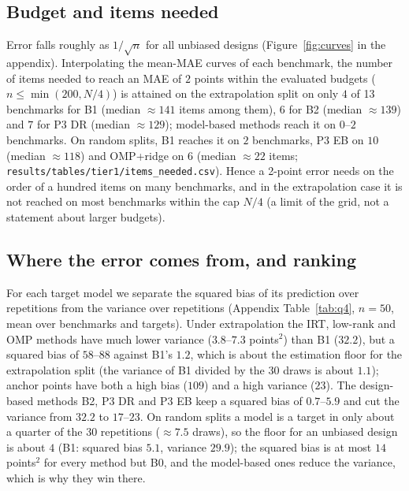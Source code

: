 \begin{table}[t]
\caption{Ablation of P3 on the 13 Tier-1 benchmarks: MAE difference to the random subset mean B1 (points; negative is better), with 95\% two-level (repetitions, then target models) bootstrap intervals, and contrasts between estimators (repetition-only intervals, same sign convention: first minus second). Generated by \texttt{paper/make\_tables.py} from \texttt{results/tables/review/}.}
\label{tab:ablation}
\centering
\resizebox{\linewidth}{!}{}
\end{table}

\subsection{Budget and items needed}
Error falls roughly as $1/\sqrt n$ for all unbiased designs (Figure~\ref{fig:curves} in the appendix). Interpolating the mean-MAE curves of each benchmark, the number of items needed to reach an MAE of $2$ points within the evaluated budgets ($n\le\min(200,N/4)$) is attained on the extrapolation split on only $4$ of 13 benchmarks for B1 (median $\approx 141$ items among them), $6$ for B2 (median $\approx 139$) and $7$ for P3 DR (median $\approx 129$); model-based methods reach it on $0$--$2$ benchmarks. On random splits, B1 reaches it on $2$ benchmarks, P3 EB on $10$ (median $\approx118$) and OMP+ridge on $6$ (median $\approx 22$ items; \texttt{results/tables/tier1/items\_needed.csv}). Hence a 2-point error needs on the order of a hundred items on many benchmarks, and in the extrapolation case it is not reached on most benchmarks within the cap $N/4$ (a limit of the grid, not a statement about larger budgets).

\subsection{Where the error comes from, and ranking}
For each target model we separate the squared bias of its prediction over repetitions from the variance over repetitions (Appendix Table~\ref{tab:q4}, $n{=}50$, mean over benchmarks and targets). Under extrapolation the IRT, low-rank and OMP methods have much lower variance ($3.8$--$7.3$ points$^2$) than B1 ($32.2$), but a squared bias of $58$--$88$ against B1's $1.2$, which is about the estimation floor for the extrapolation split (the variance of B1 divided by the $30$ draws is about $1.1$); anchor points have both a high bias ($109$) and a high variance ($23$). The design-based methods B2, P3 DR and P3 EB keep a squared bias of $0.7$--$5.9$ and cut the variance from $32.2$ to $17$--$23$. On random splits a model is a target in only about a quarter of the $30$ repetitions ($\approx7.5$ draws), so the floor for an unbiased design is about $4$ (B1: squared bias $5.1$, variance $29.9$); the squared bias is at most $14$ points$^2$ for every method but B0, and the model-based ones reduce the variance, which is why they win there.

